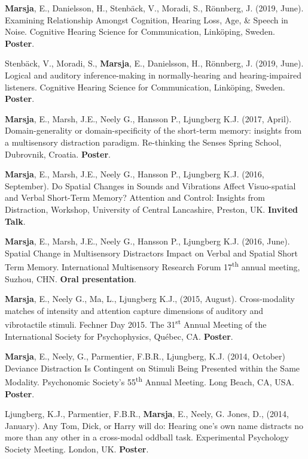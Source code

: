 \documentclass[]{article}
\begin{document}
\textbf{Marsja}, E., Danielsson, H., Stenbäck, V., Moradi, S., Rönnberg,
J. (2019, June). Examining Relationship Amongst Cognition, Hearing Loss,
Age, \& Speech in Noise. Cognitive Hearing Science for Communication,
Linköping, Sweden. \textbf{Poster}.

Stenbäck, V., Moradi, S., \textbf{Marsja}, E., Danielsson, H., Rönnberg,
J. (2019, June). Logical and auditory inference-making in
normally-hearing and hearing-impaired listeners. Cognitive Hearing
Science for Communication, Linköping, Sweden. \textbf{Poster}.

\textbf{Marsja}, E., Marsh, J.E., Neely G., Hansson P., Ljungberg K.J.
(2017, April). Domain-generality or domain-specificity of the short-term
memory: insights from a multisensory distraction paradigm. Re-thinking
the Senses Spring School, Dubrovnik, Croatia. \textbf{Poster}.

\textbf{Marsja}, E., Marsh, J.E., Neely G., Hansson P., Ljungberg K.J.
(2016, September). Do Spatial Changes in Sounds and Vibrations Affect
Visuo-spatial and Verbal Short-Term Memory? Attention and Control:
Insights from Distraction, Workshop, University of Central Lancashire,
Preston, UK. \textbf{Invited Talk}.

\textbf{Marsja}, E., Marsh, J.E., Neely G., Hansson P., Ljungberg K.J.
(2016, June). Spatial Change in Multisensory Distractors Impact on
Verbal and Spatial Short Term Memory. International Multisensory
Research Forum 17\textsuperscript{th} annual meeting, Suzhou, CHN.
\textbf{Oral presentation}.

\textbf{Marsja}, E., Neely G., Ma, L., Ljungberg K.J., (2015, August).
Cross-modality matches of intensity and attention capture dimensions of
auditory and vibrotactile stimuli. Fechner Day 2015. The
31\textsuperscript{st} Annual Meeting of the International Society for
Psychophysics, Québec, CA. \textbf{Poster}.

\textbf{Marsja}, E., Neely, G., Parmentier, F.B.R., Ljungberg, K.J.
(2014, October) Deviance Distraction Is Contingent on Stimuli Being
Presented within the Same Modality. Psychonomic Society's
55\textsuperscript{th} Annual Meeting. Long Beach, CA, USA.
\textbf{Poster}.

Ljungberg, K.J., Parmentier, F.B.R., \textbf{Marsja}, E., Neely, G.
Jones, D., (2014, January). Any Tom, Dick, or Harry will do: Hearing
one's own name distracts no more than any other in a cross-modal oddball
task. Experimental Psychology Society Meeting. London, UK.
\textbf{Poster}.
\end{document}
